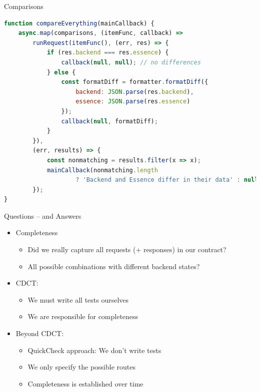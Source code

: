 \begin{frame}[fragile]{Comparisons}

\begin{lstlisting}[language=JavaScript]
function compareEverything(mainCallback) {
    async.map(comparisons, (itemFunc, callback) => 
        runRequest(itemFunc(), (err, res) => {
            if (res.backend === res.essence) {
                callback(null, null); // no differences
            } else {
                const formatDiff = formatter.formatDiff({
                    backend: JSON.parse(res.backend),
                    essence: JSON.parse(res.essence)
                });
                callback(null, formatDiff);
            }
        }),
        (err, results) => {
            const nonmatching = results.filter(x => x);
            mainCallback(nonmatching.length
                    ? 'Backend and Essence differ in their data' : null);
        });
}
\end{lstlisting}

\end{frame}



\begin{frame}[fragile]{Questions -- and Answers}

\begin{itemize}
\item Completeness
\begin{itemize}
\item Did we really capture all requests (+ responses) in our contract?
\item All possible combinations with different backend states?
\end{itemize}
\end{itemize}

\onslide<+->
\begin{itemize}[<+->]
\item CDCT:
\begin{itemize}
\item We must write all tests ourselves
\item We are responsible for completeness
\end{itemize}
\vspace{.4em}
\item Beyond CDCT:
\begin{itemize}
\item QuickCheck approach: We don't write tests
\item We only specify the possible routes
\item Completeness is established over time
\end{itemize}
\end{itemize}

\end{frame}


